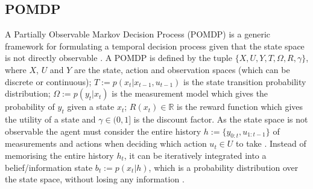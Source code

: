 \documentclass[final,5p,times,twocolumn]{elsarticle}
\begin{document}
\subsection{POMDP}



A Partially Observable Markov Decision Process (POMDP) is a generic framework for formulating a temporal decision process 
given that the state space is not directly observable \cite{Sondik_1973}. A POMDP is defined by the tuple $\{X,U,Y,T,\Omega,R,\gamma\}$, 
where $X$, $U$ and $Y$ are the state, action and observation spaces (which can be discrete or continuous);
${T:= p(x_t|x_{t-1},u_{t-1})}$ is the state transition probability distribution; $\Omega := p(y_t|x_t)$ is 
the measurement model which gives the probability of $y_t$ given a state $x_t$; $R(x_t) \in \mathbb{R}$ is the reward function
which gives the utility of a state and $\gamma \in (0,1]$ is the discount factor. As the state space is not 
observable the agent must consider the entire history $h := \{y_{0:t},u_{1:t-1}\}$ of measurements and actions
when deciding which action $u_t \in U$ to take \cite{Ross08onlineplanning}. Instead of memorising the entire history $h_t$, 
it can be iteratively integrated into a belief/information state ${b_t := p(x_t|h)}$, which 
is a probability distribution over the state space, without losing any information \cite{Milos_POMDP_2000}.
\end{document}
